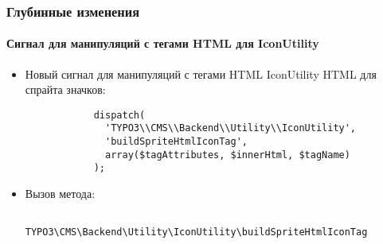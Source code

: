 \begin{frame}[fragile]
	\frametitle{Глубинные изменения}
	\framesubtitle{Сигнал для манипуляций с тегами HTML для IconUtility}

	\lstset{
		basicstyle=\tiny\ttfamily
	}

	\begin{itemize}

		\item Новый сигнал для манипуляций с тегами HTML IconUtility HTML для спрайта значков:

		\begin{lstlisting}
			dispatch(
			  'TYPO3\\CMS\\Backend\\Utility\\IconUtility',
			  'buildSpriteHtmlIconTag',
			  array($tagAttributes, $innerHtml, $tagName)
			);
		\end{lstlisting}

		\item Вызов метода:

		\begin{lstlisting}
			TYPO3\CMS\Backend\Utility\IconUtility\buildSpriteHtmlIconTag
		\end{lstlisting}

	\end{itemize}

\end{frame}


